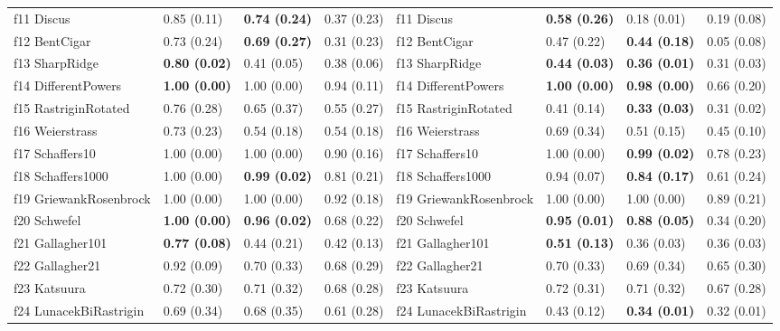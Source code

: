 \begin{table}
\begin{tabular}{llllllll}
f11 Discus & 0.85 (0.11) & \textbf{0.74 (0.24)} & 0.37 (0.23) & f11 Discus & \textbf{0.58 (0.26)} & 0.18 (0.01) & 0.19 (0.08) \\
f12 BentCigar & 0.73 (0.24) & \textbf{0.69 (0.27)} & 0.31 (0.23) & f12 BentCigar & 0.47 (0.22) & \textbf{0.44 (0.18)} & 0.05 (0.08) \\
f13 SharpRidge & \textbf{0.80 (0.02)} & 0.41 (0.05) & 0.38 (0.06) & f13 SharpRidge & \textbf{0.44 (0.03)} & \textbf{0.36 (0.01)} & 0.31 (0.03) \\
f14 DifferentPowers & \textbf{1.00 (0.00)} & 1.00 (0.00) & 0.94 (0.11) & f14 DifferentPowers & \textbf{1.00 (0.00)} & \textbf{0.98 (0.00)} & 0.66 (0.20) \\
f15 RastriginRotated & 0.76 (0.28) & 0.65 (0.37) & 0.55 (0.27) & f15 RastriginRotated & 0.41 (0.14) & \textbf{0.33 (0.03)} & 0.31 (0.02) \\
f16 Weierstrass & 0.73 (0.23) & 0.54 (0.18) & 0.54 (0.18) & f16 Weierstrass & 0.69 (0.34) & 0.51 (0.15) & 0.45 (0.10) \\
f17 Schaffers10 & 1.00 (0.00) & 1.00 (0.00) & 0.90 (0.16) & f17 Schaffers10 & 1.00 (0.00) & \textbf{0.99 (0.02)} & 0.78 (0.23) \\
f18 Schaffers1000 & 1.00 (0.00) & \textbf{0.99 (0.02)} & 0.81 (0.21) & f18 Schaffers1000 & 0.94 (0.07) & \textbf{0.84 (0.17)} & 0.61 (0.24) \\
f19 GriewankRosenbrock & 1.00 (0.00) & 1.00 (0.00) & 0.92 (0.18) & f19 GriewankRosenbrock & 1.00 (0.00) & 1.00 (0.00) & 0.89 (0.21) \\
f20 Schwefel & \textbf{1.00 (0.00)} & \textbf{0.96 (0.02)} & 0.68 (0.22) & f20 Schwefel & \textbf{0.95 (0.01)} & \textbf{0.88 (0.05)} & 0.34 (0.20) \\
f21 Gallagher101 & \textbf{0.77 (0.08)} & 0.44 (0.21) & 0.42 (0.13) & f21 Gallagher101 & \textbf{0.51 (0.13)} & 0.36 (0.03) & 0.36 (0.03) \\
f22 Gallagher21 & 0.92 (0.09) & 0.70 (0.33) & 0.68 (0.29) & f22 Gallagher21 & 0.70 (0.33) & 0.69 (0.34) & 0.65 (0.30) \\
f23 Katsuura & 0.72 (0.30) & 0.71 (0.32) & 0.68 (0.28) & f23 Katsuura & 0.72 (0.31) & 0.71 (0.32) & 0.67 (0.28) \\
f24 LunacekBiRastrigin & 0.69 (0.34) & 0.68 (0.35) & 0.61 (0.28) & f24 LunacekBiRastrigin & 0.43 (0.12) & \textbf{0.34 (0.01)} & 0.32 (0.01) \\
\bottomrule
\end{tabular}
\end{table}
